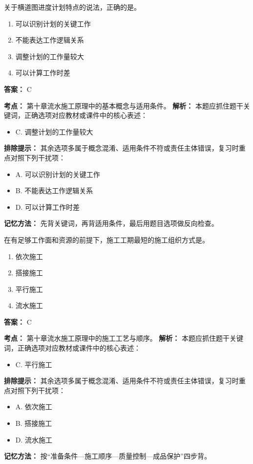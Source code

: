 \documentclass[UTF8,fontset=fandol,11pt]{ctexart}
\begin{document}
\begin{quizbox}[title={第 1 题}]
关于横道图进度计划特点的说法，正确的是。\\
\begin{enumerate}[label=\Alph*.]
\item 可以识别计划的关键工作
\item 不能表达工作逻辑关系
\item 调整计划的工作量较大
\item 可以计算工作时差
\end{enumerate}
\textbf{答案：} C
\vspace{0.25em}
\begin{answerbox}[title={考点解析}]
\textbf{考点：} 第十章流水施工原理中的基本概念与适用条件。
\textbf{解析：} 本题应抓住题干关键词，正确选项对应教材或课件中的核心表述：
\begin{itemize}
\item C. 调整计划的工作量较大
\end{itemize}
\textbf{排除提示：} 其余选项多属于概念混淆、适用条件不符或责任主体错误，复习时重点对照下列干扰项：
\begin{itemize}
\item A. 可以识别计划的关键工作
\item B. 不能表达工作逻辑关系
\item D. 可以计算工作时差
\end{itemize}
\textbf{记忆方法：} 先背关键词，再背适用条件，最后用题目选项做反向检查。
\end{answerbox}
\end{quizbox}

\begin{quizbox}[title={第 2 题}]
在有足够工作面和资源的前提下，施工工期最短的施工组织方式是。\\
\begin{enumerate}[label=\Alph*.]
\item 依次施工
\item 搭接施工
\item 平行施工
\item 流水施工
\end{enumerate}
\textbf{答案：} C
\vspace{0.25em}
\begin{answerbox}[title={考点解析}]
\textbf{考点：} 第十章流水施工原理中的施工工艺与顺序。
\textbf{解析：} 本题应抓住题干关键词，正确选项对应教材或课件中的核心表述：
\begin{itemize}
\item C. 平行施工
\end{itemize}
\textbf{排除提示：} 其余选项多属于概念混淆、适用条件不符或责任主体错误，复习时重点对照下列干扰项：
\begin{itemize}
\item A. 依次施工
\item B. 搭接施工
\item D. 流水施工
\end{itemize}
\textbf{记忆方法：} 按“准备条件—施工顺序—质量控制—成品保护”四步背。
\end{answerbox}
\end{quizbox}
\end{document}
